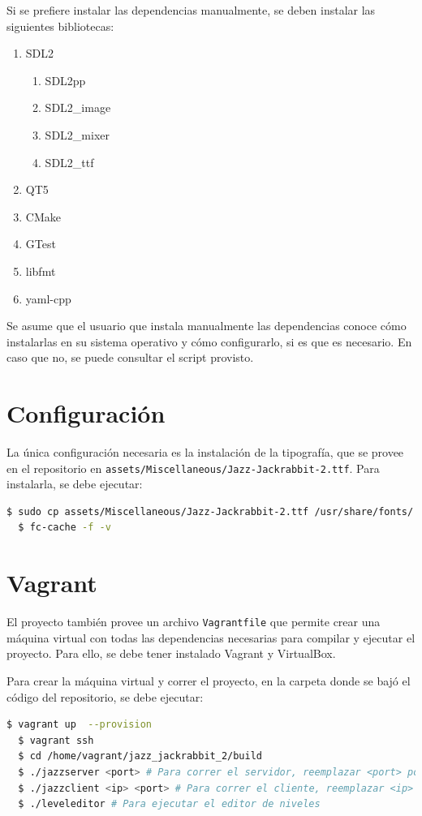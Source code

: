 \documentclass[titlepage,a4paper]{article}
\begin{document}
Si se prefiere instalar las dependencias manualmente, se deben instalar las siguientes bibliotecas:

\begin{enumerate}
  \item SDL2
  \begin{enumerate}
    \item SDL2pp
    \item SDL2\_image
    \item SDL2\_mixer
    \item SDL2\_ttf
  \end{enumerate}
  \item QT5
  \item CMake
  \item GTest
  \item libfmt
  \item yaml-cpp
\end{enumerate}

Se asume que el usuario que instala manualmente las dependencias conoce cómo instalarlas en su sistema operativo y cómo configurarlo, si es que es necesario. En caso que no, se puede consultar el script provisto.

\section{Configuración}
La única configuración necesaria es la instalación de la tipografía, que se provee en el repositorio en \texttt{assets/Miscellaneous/Jazz-Jackrabbit-2.ttf}. Para instalarla, se debe ejecutar:

\begin{lstlisting}[language=sh,caption=Instalación de la Tipografía, captionpos=b]
  $ sudo cp assets/Miscellaneous/Jazz-Jackrabbit-2.ttf /usr/share/fonts/
  $ fc-cache -f -v
\end{lstlisting}

\section{Vagrant}
El proyecto también provee un archivo \texttt{Vagrantfile} que permite crear una máquina virtual con todas las dependencias necesarias para compilar y ejecutar el proyecto. Para ello, se debe tener instalado Vagrant y VirtualBox.

Para crear la máquina virtual y correr el proyecto, en la carpeta donde se bajó el código del repositorio, se debe ejecutar:

\begin{lstlisting}[language=sh,caption=Creación de la Máquina Virtual, captionpos=b]
  $ vagrant up  --provision
  $ vagrant ssh
  $ cd /home/vagrant/jazz_jackrabbit_2/build
  $ ./jazzserver <port> # Para correr el servidor, reemplazar <port> por un puerto a elección
  $ ./jazzclient <ip> <port> # Para correr el cliente, reemplazar <ip> por la IP del servidor (localhost) y <port> por el puerto
  $ ./leveleditor # Para ejecutar el editor de niveles
\end{lstlisting}
\end{document}
